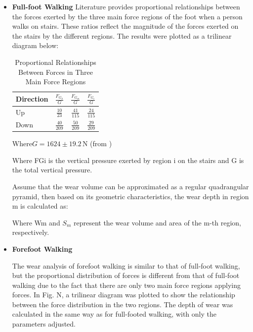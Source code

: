 \documentclass{mcmthesis}
\begin{document}
  \begin{itemize}[label=$\diamond$]
  
    \item \textbf{Full-foot Walking}
  Literature \cite{ WOS:000678697003082}provides proportional relationships between the forces exerted by the three main force regions of the foot when a person walks on stairs. These ratios reflect the magnitude of the forces exerted on the stairs by the different regions. The results were plotted as a trilinear diagram below:
  
  \begin{table}[h!]
    \centering
    \caption{Proportional Relationships Between Forces in Three Main Force Regions}
    \begin{tabular}{@{}lccc@{}}
    \toprule
    \textbf{Direction} & \(\frac{F_{G_h}}{G}\) & \(\frac{F_{G_m}}{G}\) & \(\frac{F_{G_c}}{G}\) \\ \midrule
    Up   & \( \frac{10}{23} \)  & \( \frac{41}{115} \) & \( \frac{24}{115} \) \\
    Down & \( \frac{40}{209} \) & \( \frac{50}{209} \) & \( \frac{29}{209} \) \\ \bottomrule
    \end{tabular}
    \end{table}

  Where\( G = 1624 \pm 19.2 \, \text{N} \) (from \cite{1})%

  
  Where FGi is the vertical pressure exerted by region i on the stairs and G is the total vertical pressure.
  
  
  Assume that the wear volume can be approximated as a regular quadrangular pyramid, then based on its geometric characteristics, the wear depth in region m is calculated as:
  
  Where Wm and \(S_m\) represent the wear volume and area of the m-th region, respectively.
  \item \textbf{Forefoot Walking}
  
  The wear analysis of forefoot walking is similar to that of full-foot walking, but the proportional distribution of forces is different from that of full-foot walking due to the fact that there are only two main force regions applying forces. In Fig. N, a trilinear diagram was plotted to show the relationship between the force distribution in the two regions. The depth of wear was calculated in the same way as for full-footed walking, with only the parameters adjusted.
  \end{itemize}
\end{document}

